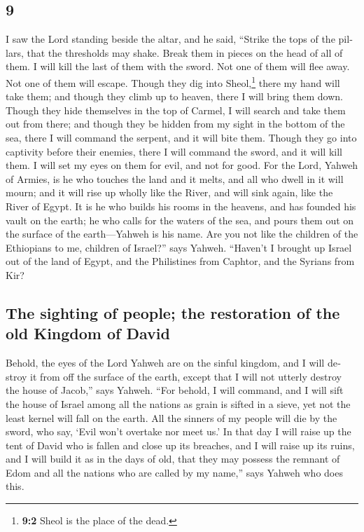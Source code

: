 \begin{paracol}{2}
\begin{otherlanguage}{english}
{\section{9}\label{section-17}}

 I saw the Lord standing beside the altar, and he said,
``Strike the tops of the pillars, that the thresholds may shake. Break
them in pieces on the head of all of them. I will kill the last of them
with the sword. Not one of them will flee away. Not one of them will
escape.  Though they dig into Sheol,\footnote{\textbf{9:2}
  Sheol is the place of the dead.} there my hand will take them; and
though they climb up to heaven, there I will bring them down.
 Though they hide themselves in the top of Carmel, I will
search and take them out from there; and though they be hidden from my
sight in the bottom of the sea, there I will command the serpent, and it
will bite them.  Though they go into captivity before
their enemies, there I will command the sword, and it will kill them. I
will set my eyes on them for evil, and not for good.  For
the Lord, Yahweh of Armies, is he who touches the land and it melts, and
all who dwell in it will mourn; and it will rise up wholly like the
River, and will sink again, like the River of Egypt.  It
is he who builds his rooms in the heavens, and has founded his vault on
the earth; he who calls for the waters of the sea, and pours them out on
the surface of the earth---Yahweh is his name.  Are you
not like the children of the Ethiopians to me, children of Israel?''
says Yahweh. ``Haven't I brought up Israel out of the land of Egypt, and
the Philistines from Caphtor, and the Syrians from Kir?

\hypertarget{the-sighting-of-people-the-restoration-of-the-old-kingdom-of-david}{%
\subsection{The sighting of people; the restoration of the old Kingdom
of
David}\label{the-sighting-of-people-the-restoration-of-the-old-kingdom-of-david}}

 Behold, the eyes of the Lord Yahweh are on the sinful
kingdom, and I will destroy it from off the surface of the earth, except
that I will not utterly destroy the house of Jacob,'' says Yahweh.
 ``For behold, I will command, and I will sift the house
of Israel among all the nations as grain is sifted in a sieve, yet not
the least kernel will fall on the earth.  All the sinners
of my people will die by the sword, who say, `Evil won't overtake nor
meet us.'  In that day I will raise up the tent of David
who is fallen and close up its breaches, and I will raise up its ruins,
and I will build it as in the days of old,  that they may
possess the remnant of Edom and all the nations who are called by my
name,'' says Yahweh who does this.


\end{otherlanguage}
\end{paracol}
